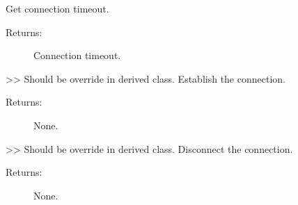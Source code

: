 \documentclass[letterpaper,10pt,english]{sphinxmanual}
\begin{document}
\begin{fulllineitems}
\begin{fulllineitems}
\begin{description}
\end{description}

\end{fulllineitems}


\begin{fulllineitems}
\label{\detokenize{QConnectBase:QConnectBase.tcp.tcp_base.TCPBase.conn_timeout}}
\sphinxAtStartPar
Get connection timeout.
\begin{description}
\item[{Returns:}] \leavevmode
\sphinxAtStartPar
Connection timeout.

\end{description}

\end{fulllineitems}


\begin{fulllineitems}
\label{\detokenize{QConnectBase:QConnectBase.tcp.tcp_base.TCPBase.connect}}
\sphinxAtStartPar
\textgreater{}\textgreater{} Should be override in derived class.
Establish the connection.
\begin{description}
\item[{Returns:}] \leavevmode
\sphinxAtStartPar
None.

\end{description}

\end{fulllineitems}


\begin{fulllineitems}
\label{\detokenize{QConnectBase:QConnectBase.tcp.tcp_base.TCPBase.disconnect}}
\sphinxAtStartPar
\textgreater{}\textgreater{} Should be override in derived class.
Disconnect the connection.
\begin{description}
\item[{Returns:}] \leavevmode
\sphinxAtStartPar
None.


\end{description}
\end{fulllineitems}
\end{fulllineitems}
\end{document}
